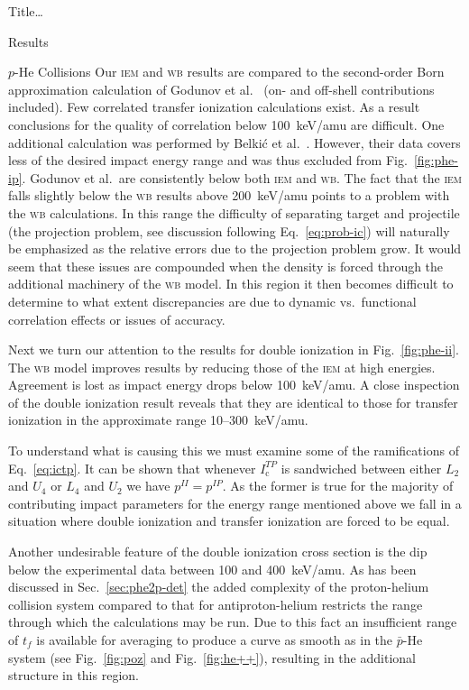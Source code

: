 \documentclass[letterpaper, 11 pt]{report}
\begin{document}
\begin{chapter}{ Title\dots \label{chap:p-he2p-he}}
\begin{section}{Results \label{sec:phe2p-res}}
\begin{subsection}{\texorpdfstring{$p$}{p}-He Collisions \label{sec:phe-res}}
         Our \textsc{iem} and \textsc{wb} results are compared to the second-order Born approximation
         calculation of Godunov et al.~\cite{Godunov-06} (on- and off-shell contributions included). Few
         correlated transfer ionization calculations exist. As a result conclusions for the quality of
         correlation below 100~keV/amu are difficult. One additional calculation was performed by
         Belki\'{c} et al.~\cite{BM-11}. However, their data covers less of the desired impact
         energy range and was thus excluded from Fig.~\ref{fig:phe-ip}. Godunov et al.\ are
         consistently below both \textsc{iem} and \textsc{wb}. The fact that the \textsc{iem} falls
         slightly below the \textsc{wb} results above 200~keV/amu points to a problem with the
         \textsc{wb} calculations. In this range the difficulty of separating target and projectile (the
         projection problem, see discussion following Eq.~\eqref{eq:prob-ic}) will naturally be
         emphasized as the relative errors due to the projection problem grow. It would seem that these
         issues are compounded when the density is forced through the additional machinery of the
         \textsc{wb} model. In this region it then becomes difficult to determine to what extent
         discrepancies are due to dynamic vs.\ functional correlation effects or issues of accuracy.

         Next we turn our attention to the results for double ionization in Fig.~\ref{fig:phe-ii}. The
         \textsc{wb} model improves results by reducing those of the \textsc{iem} at high energies.
         Agreement is lost as impact energy drops below 100~keV/amu. A close inspection of the double
         ionization result reveals that they are identical to those for transfer ionization in the
         approximate range 10--300~keV/amu.
 
         To understand what is causing this we must examine some of the ramifications of
         Eq.~\eqref{eq:ictp}. It can be shown that whenever $I^{TP}_\mathrm{c}$ is sandwiched between
         either $L_2$ and $U_4$ or $L_4$ and $U_2$ we have $p^{II} = p^{IP}$. As the former is true for
         the majority of contributing impact parameters for the energy range mentioned above we fall in
         a situation where double ionization and transfer ionization are forced to be equal.

         Another undesirable feature of the double ionization cross section is the dip below the
         experimental data between 100 and 400~keV/amu. As has been discussed in
         Sec.~\ref{sec:phe2p-det} the added complexity of the proton-helium collision system compared to
         that for antiproton-helium restricts the range through which the calculations may be run. Due
         to this fact an insufficient range of $t_f$ is available for averaging to produce a curve as
         smooth as in the $\bar{p}$-He system (see Fig.~\ref{fig:poz} and Fig.~\ref{fig:he++}),
         resulting in the additional structure in this region.
        

\end{subsection}
\end{section}
\end{chapter}
\end{document}
